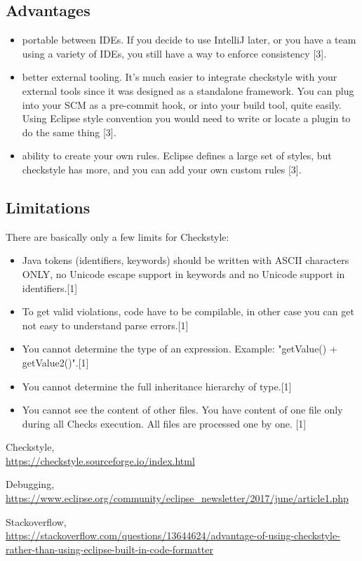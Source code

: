 \documentclass{article}
\begin{document}
\subsection{Advantages}
\begin{itemize}
    \item portable between IDEs. If you decide to use IntelliJ later, or you have a team using a variety of IDEs, you still have a way to enforce consistency [3].
    \item better external tooling. It's much easier to integrate checkstyle with your external tools since it was designed as a standalone framework. You can plug into your SCM as a pre-commit hook, or into your build tool, quite easily. Using Eclipse style convention you would need to write or locate a plugin to do the same thing [3].
    \item ability to create your own rules. Eclipse defines a large set of styles, but checkstyle has more, and you can add your own custom rules [3].
\end{itemize}
\subsection{Limitations}
There are basically only a few limits for Checkstyle:
\begin{itemize}
\item Java tokens (identifiers, keywords) should be written with ASCII characters ONLY, no Unicode escape support in keywords and no Unicode support in identifiers.[1]
\item To get valid violations, code have to be compilable, in other case you can get not easy to understand parse errors.[1]
\item You cannot determine the type of an expression. Example: "getValue() + getValue2()".[1]
\item You cannot determine the full inheritance hierarchy of type.[1]
\item You cannot see the content of other files. You have content of one file only during all Checks execution. All files are processed one by one. [1]
\end{itemize}
\begin{thebibliography}{9}
Checkstyle,\\
\url{https://checkstyle.sourceforge.io/index.html}

Debugging,\\
\url{https://www.eclipse.org/community/eclipse_newsletter/2017/june/article1.php}

Stackoverflow,\\
\url{https://stackoverflow.com/questions/13644624/advantage-of-using-checkstyle-rather-than-using-eclipse-built-in-code-formatter}
\end{thebibliography}
\end{document}
